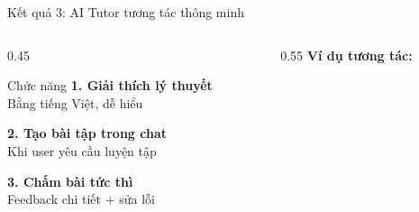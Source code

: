 \documentclass[notheorems,hyperref={bookmarks=true}]{beamer}
\begin{document}
\begin{frame}{Kết quả 3: AI Tutor tương tác thông minh}
\begin{columns}
    \begin{column}{0.45\textwidth}
        \begin{exampleblock}{Chức năng}
            \textbf{1. Giải thích lý thuyết}\\
            {\footnotesize Bằng tiếng Việt, dễ hiểu}
            
            \vspace{0.2cm}
            
            \textbf{2. Tạo bài tập trong chat}\\
            {\footnotesize Khi user yêu cầu luyện tập}
            
            \vspace{0.2cm}
            
            \textbf{3. Chấm bài tức thì}\\
            {\footnotesize Feedback chi tiết + sửa lỗi}
        \end{exampleblock}
    \end{column}
    \begin{column}{0.55\textwidth}
        \centering
        \textbf{Ví dụ tương tác:}\\[0.2cm]
    \end{column}
\end{columns}
\end{frame}
\end{document}
